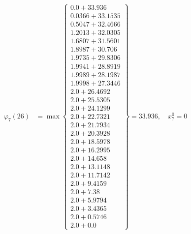 \documentclass{article}
\begin{document}
\begin{align*}
\varphi_{7}(26) &= \max \left\{ \begin{array}{c}
0.0 + 33.936 \\
 0.0366 + 33.1535 \\
 0.5047 + 32.4666 \\
 1.2013 + 32.0305 \\
 1.6807 + 31.5601 \\
 1.8987 + 30.706 \\
 1.9735 + 29.8306 \\
 1.9941 + 28.8919 \\
 1.9989 + 28.1987 \\
 1.9998 + 27.3446 \\
 2.0 + 26.4692 \\
 2.0 + 25.5305 \\
 2.0 + 24.1299 \\
 2.0 + 22.7321 \\
 2.0 + 21.7934 \\
 2.0 + 20.3928 \\
 2.0 + 18.5978 \\
 2.0 + 16.2995 \\
 2.0 + 14.658 \\
 2.0 + 13.1148 \\
 2.0 + 11.7142 \\
 2.0 + 9.4159 \\
 2.0 + 7.38 \\
 2.0 + 5.9794 \\
 2.0 + 3.4365 \\
 2.0 + 0.5746 \\
 2.0 + 0.0
\end{array} \right\}=33.936, \quad x_{7}^0=0\\
  

\end{align*}
\end{document}
